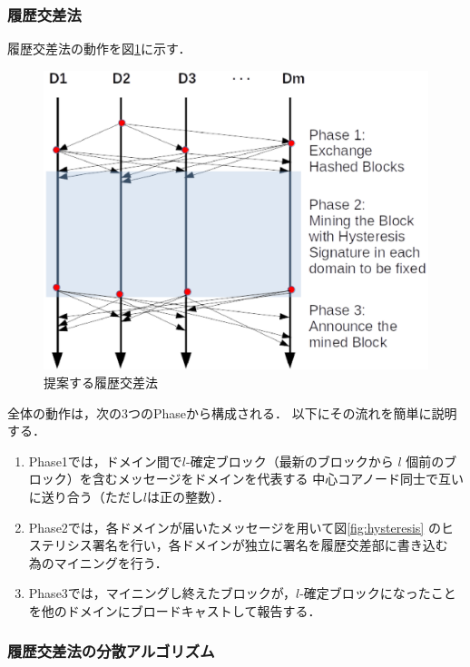 \documentclass[a4paper,12pt]{jsarticle}
\begin{document}
      \subsubsection{履歴交差法}
履歴交差法の動作を図\ref{fig:cross-ref}に示す．
%
\begin{figure}[H]%
  \begin{center}
    \includegraphics[width=120mm]{pht/time_sequence-algorithm1.eps}
  \end{center}
  \caption{提案する履歴交差法}
  \label{fig:cross-ref}
\end{figure}
%
全体の動作は，次の3つのPhaseから構成される．
以下にその流れを簡単に説明する．

\hspace{5mm}
%
\begin{enumerate}
\item Phase1では，ドメイン間で$l$-確定ブロック（最新のブロックから 
      $l$ 個前のブロック）を含むメッセージをドメインを代表する
      中心コアノード同士で互いに送り合う（ただし$l$は正の整数）．

\item Phase2では，各ドメインが届いたメッセージを用いて図\ref{fig:hysteresis}
      のヒステリシス署名を行い，各ドメインが独立に署名を履歴交差部に書き込む
      為のマイニングを行う．

\item Phase3では，マイニングし終えたブロックが，$l$-確定ブロックになったこと
      を他のドメインにブロードキャストして報告する．
\end{enumerate}
%
\hspace{5mm}

      \subsubsection{履歴交差法の分散アルゴリズム}
\end{document}
